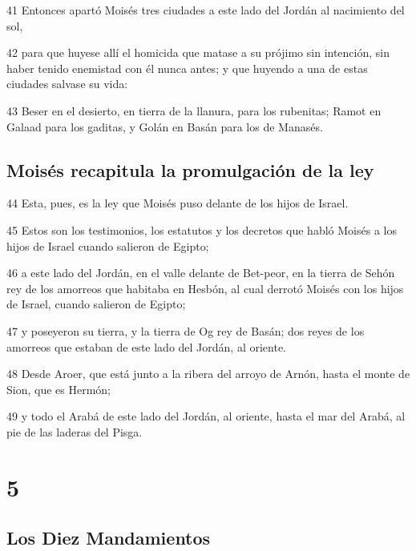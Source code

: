 \par 41 Entonces apartó Moisés tres ciudades a este lado del Jordán al nacimiento del sol,
\par 42 para que huyese allí el homicida que matase a su prójimo sin intención, sin haber tenido enemistad con él nunca antes; y que huyendo a una de estas ciudades salvase su vida:
\par 43 Beser en el desierto, en tierra de la llanura, para los rubenitas; Ramot en Galaad para los gaditas, y Golán en Basán para los de Manasés.

\section{Moisés recapitula la promulgación de la ley}

\par 44 Esta, pues, es la ley que Moisés puso delante de los hijos de Israel.
\par 45 Estos son los testimonios, los estatutos y los decretos que habló Moisés a los hijos de Israel cuando salieron de Egipto;
\par 46 a este lado del Jordán, en el valle delante de Bet-peor, en la tierra de Sehón rey de los amorreos que habitaba en Hesbón, al cual derrotó Moisés con los hijos de Israel, cuando salieron de Egipto;
\par 47 y poseyeron su tierra, y la tierra de Og rey de Basán; dos reyes de los amorreos que estaban de este lado del Jordán, al oriente. 
\par 48 Desde Aroer, que está junto a la ribera del arroyo de Arnón, hasta el monte de Sion, que es Hermón; 
\par 49 y todo el Arabá de este lado del Jordán, al oriente, hasta el mar del Arabá, al pie de las laderas del Pisga.

\chapter{5}

\section{Los Diez Mandamientos }

